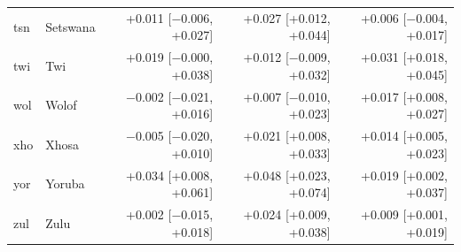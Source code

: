 {\begin{longtable}{@{}llrrr@{}}
tsn & Setswana & +0.011 [$-$0.006, +0.027] & +0.027 [+0.012, +0.044] & +0.006 [$-$0.004, +0.017] \\
twi & Twi & +0.019 [$-$0.000, +0.038] & +0.012 [$-$0.009, +0.032] & +0.031 [+0.018, +0.045] \\
wol & Wolof & $-$0.002 [$-$0.021, +0.016] & +0.007 [$-$0.010, +0.023] & +0.017 [+0.008, +0.027] \\
xho & Xhosa & $-$0.005 [$-$0.020, +0.010] & +0.021 [+0.008, +0.033] & +0.014 [+0.005, +0.023] \\
yor & Yoruba & +0.034 [+0.008, +0.061] & +0.048 [+0.023, +0.074] & +0.019 [+0.002, +0.037] \\
zul & Zulu & +0.002 [$-$0.015, +0.018] & +0.024 [+0.009, +0.038] & +0.009 [+0.001, +0.019] \\
\end{longtable}}
